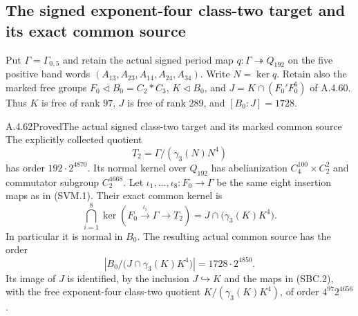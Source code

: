 \subsection{The signed exponent-four class-two target and its exact common source}

Put $\Gamma=\Gamma_{0,5}$ and retain the actual signed period
map $q:\Gamma\twoheadrightarrow Q_{192}$ on the five positive band
words $(A_{13},A_{23},A_{14},A_{24},A_{34})$.  Write $N=\ker q$.
Retain also the marked free groups $F_0\triangleleft B_0=C_2*C_3$,
$K\triangleleft B_0$, and $J=K\cap(F_0'F_0^6)$ of A.4.60.
Thus $K$ is free of rank $97$, $J$ is free of rank $289$,
and $[B_0:J]=1728$.

\begin{result}{A.4.62}{Proved}{The actual signed class-two target and its marked common source}
The explicitly collected quotient
\[
 T_2=\Gamma/(\gamma_3(N)N^4)
\tag{SBC.1}
\]
has order $192\cdot2^{4870}$.  Its normal kernel over $Q_{192}$
has abelianization $C_4^{100}\times C_2^2$ and commutator subgroup
$C_2^{4668}$.  Let $\iota_1,\ldots,\iota_8:F_0\to\Gamma$ be the
same eight insertion maps as in (SVM.1).  Their exact common kernel is
\[
 \bigcap_{i=1}^8\ker(F_0\xrightarrow{\iota_i}\Gamma\to T_2)
       =J\cap\bigl(\gamma_3(K)K^4\bigr).
\tag{SBC.2}
\]
In particular it is normal in $B_0$.  The resulting actual common
source has the order
\[
 \left|B_0/\bigl(J\cap\gamma_3(K)K^4\bigr)\right|
        =1728\cdot 2^{4850}.
\tag{SBC.3}
\]
Its image of $J$ is identified, by the inclusion $J\hookrightarrow K$
and the maps in (SBC.2), with the free exponent-four class-two quotient
$K/(\gamma_3(K)K^4)$, of order $4^{97}2^{4656}$.

\end{result}


